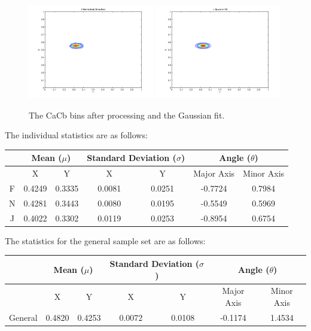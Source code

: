\begin{figure}[h!]
    \includegraphics[width=0.49\textwidth]{Chapter3/Figs/JHands_XY_fBin.jpg}
    \includegraphics[width=0.49\textwidth]{Chapter3/Figs/JHands_XY_gFit.jpg}
    \caption{The CaCb bins after processing and the Gaussian fit.}  \label{fig:FBinAndGFit}
\end{figure}

The individual statistics are as follows:
\newline

\begin{tabular}{|c|c|c|c|c|c|c|}
\hline
& \multicolumn{2}{|c|}{Mean ($\mu$)} & \multicolumn{2}{|c|}{Standard Deviation ($\sigma$)} & \multicolumn{2}{|c|}{Angle ($\theta$)} \\\hline
& X & Y & X & Y & Major Axis & Minor Axis \\\hline
F & 0.4249 & 0.3335 & 0.0081 & 0.0251 & -0.7724 & 0.7984 \\\hline
N & 0.4281 & 0.3443 & 0.0080 & 0.0195 & -0.5549 & 0.5969 \\\hline
J & 0.4022 & 0.3302 & 0.0119 & 0.0253 & -0.8954 & 0.6754 \\\hline
\end{tabular}
\newline
\vspace{0.5 cm}
\newline
The statistics for the general sample set are as follows:
\newline

\begin{tabular}{|c|c|c|c|c|c|c|}
\hline
& \multicolumn{2}{|c|}{Mean ($\mu$)} & \multicolumn{2}{|c|}{Standard Deviation ($\sigma$)} & \multicolumn{2}{|c|}{Angle ($\theta$)} \\\hline
& X & Y & X & Y & Major Axis & Minor Axis \\\hline
General & 0.4820 & 0.4253 & 0.0072 & 0.0108 & -0.1174 & 1.4534 \\\hline
\end{tabular}



